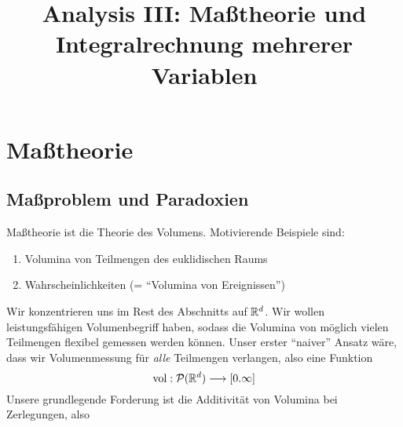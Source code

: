 
\title{Analysis III: Maßtheorie und Integralrechnung mehrerer Variablen}

{}
\newpage
\setcounter{page}{2}
\section{Maßtheorie}
\subsection{Maßproblem und Paradoxien}
Maßtheorie ist die Theorie des Volumens. Motivierende Beispiele sind:
\begin{enumerate}[label=\roman*),topsep=3pt, itemsep=0pt]
\item Volumina von Teilmengen des euklidischen Raums
\item Wahrscheinlichkeiten (= ``Volumina von Ereignissen'')
\end{enumerate}
Wir konzentrieren uns im Rest des Abschnitts auf $\mathbb{R}^d$. Wir wollen leistungsfähigen Volumenbegriff haben, sodass die Volumina von möglich vielen Teilmengen flexibel gemessen werden können. Unser erster ``naiver'' Ansatz wäre, dass wir Volumenmessung für \emph{alle} Teilmengen verlangen, also eine Funktion
\begin{equation}
 \operatorname{vol}: \mathcal{P}(\mathbb{R}^d) \longrightarrow [0.\infty]
\end{equation}
Unsere grundlegende Forderung ist die Additivität von Volumina bei Zerlegungen, also
